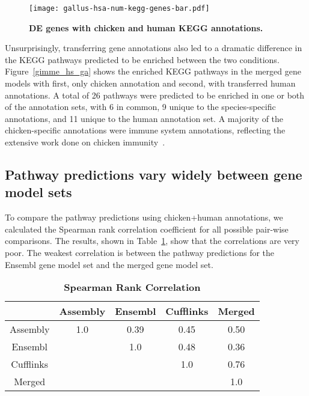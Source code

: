 \begin{figure}[!ht]
    \begin{center}
        \texttt{[image: gallus-hsa-num-kegg-genes-bar.pdf]}
    \end{center}
    \caption{
        \textbf{DE genes with chicken and human KEGG annotations.}
    }
    \label{num_kegg}
\end{figure}

Unsurprisingly, transferring gene annotations also led to a
dramatic difference in the KEGG pathways predicted to be
enriched between the two conditions.
Figure~\ref{gimme_hs_ga} shows the enriched KEGG pathways in
the merged gene models with first, only chicken annotation
and second, with transferred human annotations.  A total of
26 pathways were predicted to be enriched in one or both of
the annotation sets, with 6 in common, 9 unique to the
species-specific annotations, and 11 unique to the human
annotation set.  A majority of the chicken-specific
annotations were immune system annotations, reflecting the
extensive work done on chicken
immunity~\cite{burt2005chicken}.

\subsection{Pathway predictions vary widely between gene
model sets}

To compare the pathway predictions using chicken+human
annotations, we calculated the Spearman rank correlation
coefficient for all possible pair-wise comparisons.  The results,
shown in Table~\ref{tab:spearmanr}, show that the correlations
are very poor.  The weakest correlation is between the pathway
predictions for the Ensembl gene model set and the merged gene
model set.

\begin{table}[!ht]
\caption{
\textbf{Spearman Rank Correlation}}
\begin{center}
\begin{tabular}{ccccc}
\hline
& Assembly & Ensembl & Cufflinks & Merged \\
\hline
Assembly & 1.0 & 0.39 & 0.45 & 0.50 \\
Ensembl & & 1.0 & 0.48 & 0.36 \\
Cufflinks & & & 1.0 & 0.76 \\
Merged & & & & 1.0 \\
\hline
\end{tabular}
\end{center}
\label{tab:spearmanr}
\end{table}

